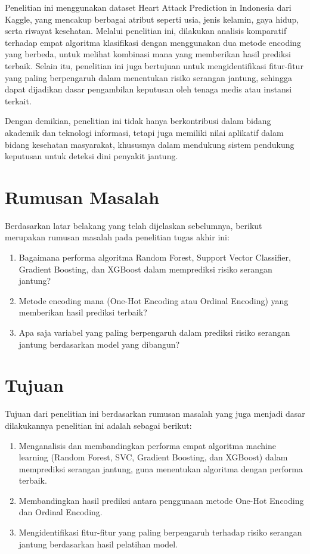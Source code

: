Penelitian ini menggunakan dataset Heart Attack Prediction in Indonesia dari Kaggle, yang mencakup berbagai atribut seperti usia, jenis kelamin, gaya hidup, serta riwayat kesehatan. Melalui penelitian ini, dilakukan analisis komparatif terhadap empat algoritma klasifikasi dengan menggunakan dua metode encoding yang berbeda, untuk melihat kombinasi mana yang memberikan hasil prediksi terbaik. Selain itu, penelitian ini juga bertujuan untuk mengidentifikasi fitur-fitur yang paling berpengaruh dalam menentukan risiko serangan jantung, sehingga dapat dijadikan dasar pengambilan keputusan oleh tenaga medis atau instansi terkait.

Dengan demikian, penelitian ini tidak hanya berkontribusi dalam bidang akademik dan teknologi informasi, tetapi juga memiliki nilai aplikatif dalam bidang kesehatan masyarakat, khususnya dalam mendukung sistem pendukung keputusan untuk deteksi dini penyakit jantung.

\section{Rumusan Masalah}

Berdasarkan latar belakang yang telah dijelaskan sebelumnya, berikut merupakan rumusan masalah pada penelitian tugas akhir ini:

\begin{enumerate}
     \item Bagaimana performa algoritma Random Forest, Support Vector Classifier, Gradient Boosting, dan XGBoost dalam memprediksi risiko serangan jantung?
    \item Metode encoding mana (One-Hot Encoding atau Ordinal Encoding) yang memberikan hasil prediksi terbaik?
    \item Apa saja variabel yang paling berpengaruh dalam prediksi risiko serangan jantung berdasarkan model yang dibangun?
\end{enumerate}

\section{Tujuan}

Tujuan dari penelitian ini berdasarkan rumusan masalah yang juga menjadi dasar dilakukannya penelitian ini adalah sebagai berikut:

\begin{enumerate}
    \item Menganalisis dan membandingkan performa empat algoritma machine learning (Random Forest, SVC, Gradient Boosting, dan XGBoost) dalam memprediksi serangan jantung, guna menentukan algoritma dengan performa terbaik.
    \item Membandingkan hasil prediksi antara penggunaan metode One-Hot Encoding dan Ordinal Encoding.
    \item Mengidentifikasi fitur-fitur yang paling berpengaruh terhadap risiko serangan jantung berdasarkan hasil pelatihan model.
\end{enumerate}

